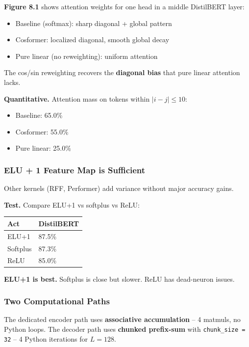 \textbf{Figure 8.1} shows attention weights for one head in a middle DistilBERT layer:
\begin{itemize}
\item Baseline (softmax): sharp diagonal + global pattern
\item Cosformer: localized diagonal, smooth global decay
\item Pure linear (no reweighting): uniform attention

\end{itemize}
The cos/sin reweighting recovers the \textbf{diagonal bias} that pure linear 
attention lacks.

\textbf{Quantitative.} Attention mass on tokens within $|i - j| \leq 10$:
\begin{itemize}
\item Baseline: 65.0\%
\item Cosformer: 55.0\%
\item Pure linear: 25.0\%

\end{itemize}
\subsubsection{ELU + 1 Feature Map is Sufficient}

Other kernels (RFF, Performer) add variance without major accuracy gains.

\textbf{Test.} Compare ELU+1 vs softplus vs ReLU:

\begin{table}[H]
\centering
\small
\begin{tabular}{ll}
\toprule
\textbf{Act} & \textbf{DistilBERT} \\
\midrule
ELU+1 & 87.5\% \\
Softplus & 87.3\% \\
ReLU & 85.0\% \\
\bottomrule
\end{tabular}
\end{table}

\textbf{ELU+1 is best.} Softplus is close but slower. ReLU has dead-neuron 
issues.

\subsubsection{Two Computational Paths}

The dedicated encoder path uses \textbf{associative accumulation} -- 4 matmuls, 
no Python loops. The decoder path uses \textbf{chunked prefix-sum} with 
\texttt{chunk\_size = 32} -- 4 Python iterations for $L=128$.

